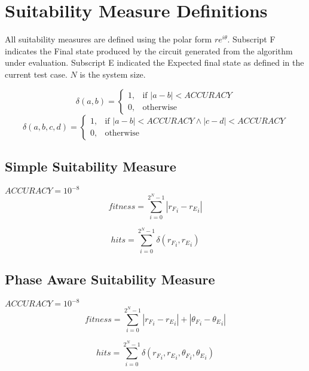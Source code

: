 \chapter{Suitability Measure Definitions}
\label{sec:suitmeasdefs}
All suitability measures are defined using the polar form $re^{i\theta}$.
Subscript F indicates the Final state produced by the circuit generated from the algorithm under evaluation.
Subscript E indicated the Expected final state as defined in the current test case.
$N$ is the system size.

\begin{equation}
 \delta(a,b)=
\left\{
  \begin{array}{cc} 1, & \mbox{if } |a-b|<ACCURACY\\ 
  0, & \mbox{otherwise}\end{array}
\right.
\end{equation}
\begin{equation}
 \delta(a,b,c,d)=
\left\{
  \begin{array}{cc} 1, & \mbox{if } |a-b|<ACCURACY\wedge|c-d|<ACCURACY\\ 
  0, & \mbox{otherwise}\end{array}
\right.
\end{equation}


\section{Simple Suitability Measure}
$ACCURACY=10^{-8}$
\begin{equation}
 fitness=\sum_{i=0}^{2^N-1}|{r_F}_i-{r_E}_i|
\end{equation}

\begin{equation}
 hits=\sum_{i=0}^{2^N-1}\delta({r_F}_i,{r_E}_i)
\end{equation}


\section{Phase Aware Suitability Measure}
$ACCURACY=10^{-8}$
\begin{equation}
 fitness=\sum_{i=0}^{2^N-1}|{r_F}_i-{r_E}_i|+|{\theta_F}_i-{\theta_E}_i|
\end{equation}

\begin{equation}
 hits=\sum_{i=0}^{2^N-1}\delta({r_F}_i,{r_E}_i,{\theta_F}_i,{\theta_E}_i)
\end{equation}
